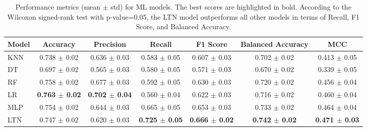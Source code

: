 \begin{table*}[]
    \centering
    \begin{adjustbox}{max width=\textwidth}
        \begin{tabular}{|l|c|c|c|c|c|c|}
            \hline
            \textbf{Model} & \textbf{Accuracy} & \textbf{Precision} & \textbf{Recall} & \textbf{F1 Score} & \textbf{Balanced Accuracy} & \textbf{MCC} \\
            \hline
            \gls{KNN}  & 0.738 $\pm$  0.02 & 0.636 $\pm$  0.03 & 0.583 $\pm$  0.05 & 0.607 $\pm$  0.03 & 0.702 $\pm$  0.02 & 0.413 $\pm$  0.05 \\
            \hline
            \gls{DT}   & 0.697 $\pm$  0.02 & 0.565 $\pm$  0.03 & 0.580 $\pm$  0.05 & 0.571 $\pm$  0.03 & 0.670 $\pm$  0.02 & 0.339 $\pm$  0.05 \\
            \hline
            \gls{RF}   & 0.758 $\pm$  0.02 & 0.677 $\pm$  0.03 & 0.592 $\pm$  0.05 & 0.630 $\pm$  0.03 & 0.720 $\pm$  0.02 & 0.456 $\pm$  0.04 \\
            \hline
            \gls{LR}   & \textbf{0.763 $\pm$  0.02 }& \textbf{0.702 $\pm$  0.04} & 0.560 $\pm$  0.04 & 0.622 $\pm$  0.03 & 0.716 $\pm$  0.02 & 0.460 $\pm$  0.04 \\
            \hline
            \gls{MLP}  & 0.754 $\pm$  0.02 & 0.644 $\pm$  0.03 & 0.665 $\pm$  0.05 & 0.653 $\pm$  0.03 & 0.733 $\pm$  0.02 & 0.464 $\pm$  0.04 \\
            \hline
            \gls{LTN}  & 0.747 $\pm$  0.02 & 0.620 $\pm$  0.03 & \textbf{0.725 $\pm$  0.05} & \textbf{0.666 $\pm$  0.02} & \textbf{0.742 $\pm$  0.02} & \textbf{0.471 $\pm$  0.03} \\
            \hline
        \end{tabular}
    \end{adjustbox}
    \caption[Performance metrics for \gls{ML} models on the \gls{PID} Dataset]{
      Performance metrics (mean $\pm$ std) for \gls{ML} models.
      The best scores are highlighted in bold.
      According to the Wilcoxon signed-rank test with p-value=0.05, the \gls{LTN} model outperforms all other models in terms of Recall, F1 Score, and Balanced Accuracy.
    }
    \label{tab:ski-diabetes-performance-metrics}
\end{table*}